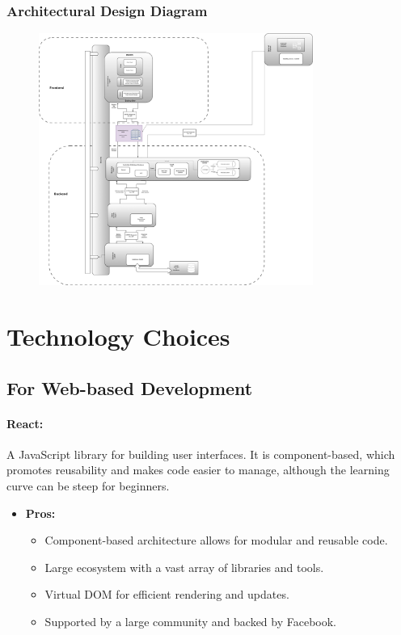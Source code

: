 \documentclass[11pt,a4paper]{article}
\begin{document}
\subsubsection*{Architectural Design Diagram}
\begin{figure}[htbp]
    \centering
    \includegraphics[width=0.8\textwidth]{Architectural Diagram.png}
\end{figure}
\pagebreak

\section*{Technology Choices}

\subsection*{For Web-based Development}

\paragraph{React:} A JavaScript library for building user interfaces. It is component-based, which promotes reusability and makes code easier to manage, although the learning curve can be steep for beginners.
\begin{itemize}
    \item \textbf{Pros:}
    \begin{itemize}
        \item Component-based architecture allows for modular and reusable code.
        \item Large ecosystem with a vast array of libraries and tools.
        \item Virtual DOM for efficient rendering and updates.
        \item Supported by a large community and backed by Facebook.
    \end{itemize}
\end{itemize}
\end{document}
